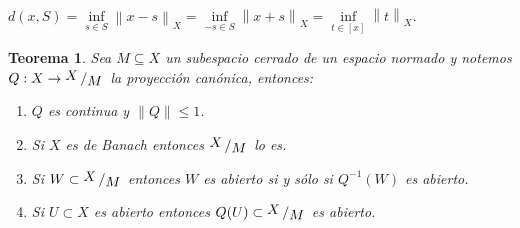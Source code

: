 \documentclass[11pt]{article}
\newcommand{\norm}[1]{\left\lVert#1\right\rVert}
\newcommand{\quotient}[2]{{\raisebox{.2em}{$#1$}\left/\raisebox{-.2em}{$#2$}\right.}}
\newtheorem{theorem}{Teorema}
\numberwithin{theorem}{subsection}
\newenvironment{proof}[1][Demostraci\'on]{\begin{trivlist}
		\item[\hskip \labelsep {\bfseries #1}]}{\end{trivlist}}
\newcommand{\qed}{\nobreak \ifvmode \relax \else
	\ifdim\lastskip<1.5em \hskip-\lastskip
	\hskip1.5em plus0em minus0.5em \fi \nobreak
	\vrule height0.75em width0.5em depth0.25em\fi}
\begin{document}
\begin{proof}
	$d(x,S) = \inf\limits_{s \in S}{\norm{x - s}_X} = \inf\limits_{-s \in S}{\norm{x + s}_X} = \inf\limits_{t \in [x]}{\norm{t}_X}$.\qed
\end{proof}

\begin{theorem}
	\label{Propiedades del espacio cociente}
	Sea $M \subseteq X$ un subespacio cerrado de un espacio normado y notemos $Q: X \rightarrow \quotient{X}{M}$ la proyecci\'on can\'onica, entonces:
	
	\begin{enumerate}
		\item $Q$ es continua y $\norm{Q} \leq 1$.
		\item Si $X$ es de Banach entonces $\quotient{X}{M}$ lo es.
		\item Si $W \subset \quotient{X}{M}$ entonces $W$ es abierto si y s\'olo si $Q^{-1}(W)$ es abierto.
		\item Si $U \subset X$ es abierto entonces $Q(U) \subset \quotient{X}{M}$ es abierto.
	\end{enumerate}
	
\end{theorem}
\end{document}
